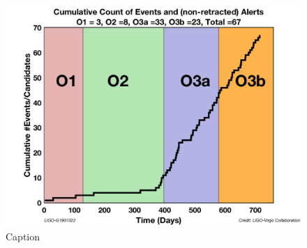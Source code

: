 \documentclass[11pt]{article}
\begin{document}
\begin{figure}[htb]
    \centering
    \includegraphics[width=.75\linewidth]{shared_resources/shared_figs/number_events.png}
    \caption{Caption}
    \label{fig:events}
\end{figure}





\newpage

\printbibliography
\end{document}

